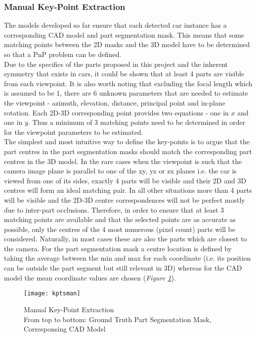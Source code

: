 \documentclass[main.tex]{subfiles}
\begin{document}
\subsubsection{Manual Key-Point Extraction}
The models developed so far ensure that each detected car instance has a corresponding CAD model and part segmentation mask. This means that some matching points between the 2D masks and the 3D model have to be determined so that a PnP problem can be defined.\\
\indent Due to the specifics of the parts proposed in this project and the inherent symmetry that exists in cars, it could be shown that at least 4 parts are visible from each viewpoint. It is also worth noting that excluding the focal length which is assumed to be 1, there are 6 unknown parameters that are needed to estimate the viewpoint - azimuth, elevation, distance, principal point and in-plane rotation. Each 2D-3D corresponding point provides two equations - one in $x$ and one in $y$. Thus a minimum of 3 matching points need to be determined in order for the viewpoint parameters to be estimated.\\
\indent The simplest and most intuitive way to define the key-points is to argue that the part centres in the part segmentation masks should match the corresponding part centres in the 3D model. In the rare cases when the viewpoint is such that the camera image plane is parallel to one of the xy, yz or zx planes i.e. the car is viewed from one of its sides, exactly 4 parts will be visible and their 2D and 3D centres will form an ideal matching pair. In all other situations more than 4 parts will be visible and the 2D-3D centre correspondences will not be perfect mostly due to inter-part occlusions. Therefore, in order to ensure that at least 3 matching points are available and that the selected points are as accurate as possible, only the centres of the 4 most numerous (pixel count) parts will be considered. Naturally, in most cases these are also the parts which are closest to the camera. For the part segmentation mask a centre location is defined by taking the average between the min and max for each coordinate (i.e. its position can be outside the part segment but still relevant in 3D) whereas for the CAD model the mean coordinate values are chosen (\emph{Figure \ref{fig:kptsman}}).
\begin{figure}[H]
\centering
\texttt{[image: kptsman]}
\captionsetup{justification=centering}
\caption{Manual Key-Point Extraction \\ From top to bottom: Ground Truth Part Segmentation Mask, Corresponsing CAD Model}
\label{fig:kptsman}
\end{figure}
\end{document}
